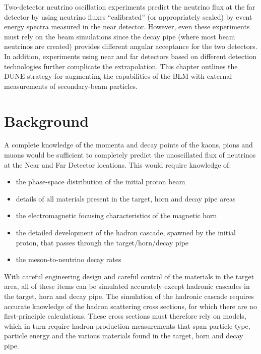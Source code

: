Two-detector neutrino oscillation experiments 
predict the neutrino flux at the far detector by using neutrino fluxes ``calibrated'' (or
appropriately scaled) by event energy spectra measured in the near detector. However, even
these experiments must rely on the beam simulations since the decay pipe (where most beam
neutrinos are created) provides different angular acceptance for the two detectors. In addition, 
experiments using near and far detectors based on different detection technologies further complicate the extrapolation. This chapter outlines the DUNE strategy for augmenting the capabilities of the BLM with
external measurements of secondary-beam particles. 


\section{Background}

A complete knowledge of the momenta and decay points of the kaons, pions and
muons would be sufficient to completely predict the unoscillated flux of neutrinos
at the Near and Far Detector locations. This would require knowledge of:

\begin{itemize}
\item the phase-space distribution of the initial proton beam
\item details of all materials present in the target, horn and decay pipe areas
\item  the electromagnetic focusing characteristics of the magnetic horn
\item the detailed development of the hadron cascade, spawned by the
initial proton, that passes through the target/horn/decay pipe
\item the meson-to-neutrino decay rates
\end{itemize}

With careful engineering design and careful control of the materials in the target
area, all of these items can be simulated accurately except hadronic cascades in
the target, horn and decay pipe. The simulation of the hadronic cascade requires
accurate knowledge of the hadron scattering cross sections, for which there are no
first-principle calculations. These cross sections must therefore rely on models, which
in turn require hadron-production measurements that span particle type, particle
energy and the various materials found in the target, horn and decay pipe.

